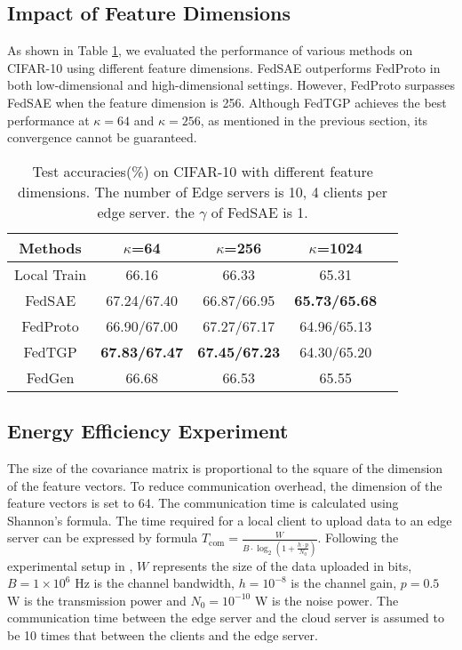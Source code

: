 \documentclass[journal]{IEEEtran}
\begin{document}
\subsection{Impact of Feature Dimensions}
\label{Impact of Feature Dimensions}

As shown in Table \ref{different Dims table}, we evaluated the performance of various methods on CIFAR-10 using different feature dimensions. FedSAE outperforms FedProto in both low-dimensional and high-dimensional settings. However, FedProto surpasses FedSAE when the feature dimension is 256. Although FedTGP achieves the best performance at \( \kappa = 64 \) and \( \kappa = 256 \), as mentioned in the previous section, its convergence cannot be guaranteed.


\begin{table}[ht]
    \centering
    \caption{Test accuracies(\%) on CIFAR-10 with different feature dimensions. The number of Edge servers is 10, 4 clients per edge server. the $\gamma$ of FedSAE is 1.}
    \begin{tabular}{|c|c|c|c|c|}
    \hline
    \textbf{Methods} & $\kappa$=64  & $\kappa$=256 & $\kappa$=1024 \\
    \hline
    Local Train & 66.16 & 66.33 & 65.31 \\
    FedSAE & 67.24/67.40 & 66.87/66.95 & \textbf{65.73/65.68} \\
    FedProto & 66.90/67.00 & 67.27/67.17 & 64.96/65.13 \\
    FedTGP & \textbf{67.83/67.47} & \textbf{67.45/67.23} & 64.30/65.20\\
    FedGen & 66.68 & 66.53 & 65.55 \\
    \hline
    \end{tabular}
    \label{different Dims table}
\end{table}


\subsection{Energy Efficiency Experiment}
\label{Energy Efficiency Experiment}
The size of the covariance matrix is proportional to the square of the dimension of the feature vectors. To reduce communication overhead, the dimension of the feature vectors is set to 64. The communication time is calculated using Shannon's formula\cite{shannon1948mathematical}. The time required for a local client to upload data to an edge server can be expressed by formula $T_{\text{com}} = \frac{W}{B\cdot\log_2\left(1 + \frac{h\cdot p}{N_0}\right)}$. Following the experimental setup in \cite{liu_hierarchical_2023}, $W$ represents the size of the data uploaded in bits, $B = 1 \times 10^6$ Hz is the channel bandwidth, $h = 10^{-8}$ is the channel gain, $p = 0.5$ W is the transmission power and $N_0 = 10^{-10}$ W is the noise power. The communication time between the edge server and the cloud server is assumed to be 10 times that between the clients and the edge server.
\end{document}

